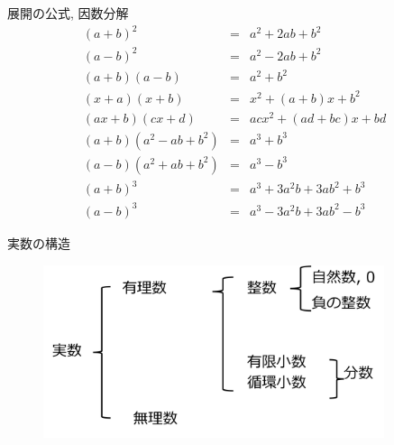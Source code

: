 \documentclass[aspectratio=169, 12pt]{beamer} %
\begin{document}
\begin{frame}{展開の公式, 因数分解}
    \begin{eqnarray*}
        (a+b)^2&=&a^2+2ab+b^2 \\
        (a-b)^2&=&a^2-2ab+b^2 \\
        (a+b)(a-b)&=&a^2+b^2 \\
        (x+a)(x+b)&=&x^2+(a+b)x+b^2 \\
        (ax+b)(cx+d)&=&acx^2+(ad+bc)x+bd \\
        (a+b)(a^2-ab+b^2)&=&a^3+b^3 \\
        (a-b)(a^2+ab+b^2)&=&a^3-b^3 \\
        (a+b)^3&=&a^3+3a^2b+3ab^2+b^3 \\
        (a-b)^3&=&a^3-3a^2b+3ab^2-b^3
    \end{eqnarray*}
\end{frame}
\begin{frame}{実数の構造}
    \begin{figure}[htbp]
        \begin{center}
            \includegraphics[width=100mm]{fig/1.png}
        \end{center}
    \end{figure}
\end{frame}
\end{document}
